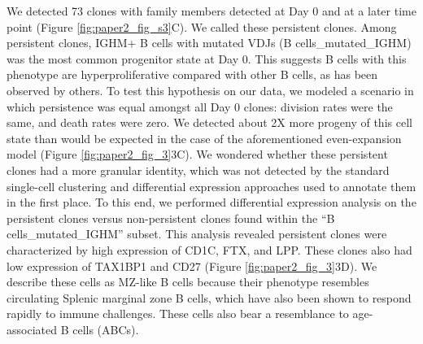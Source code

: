 We detected 73 clones with family members detected at Day 0 and at a later time point (Figure \ref{fig:paper2_fig_s3}C). We called these persistent clones. Among persistent clones, IGHM+ B cells with mutated VDJs (B cells\_mutated\_IGHM) was the most common progenitor state at Day 0. This suggests B cells with this phenotype are hyperproliferative compared with other B cells, as has been observed by others\cite{seifert_functional_2015}. To test this hypothesis on our data, we modeled a scenario in which persistence was equal amongst all Day 0 clones: division rates were the same, and death rates were zero. We detected about 2X more progeny of this cell state than would be expected in the case of the aforementioned even-expansion model (Figure \ref{fig:paper2_fig_3}3C). We wondered whether these persistent clones had a more granular identity, which was not detected by the standard single-cell clustering and differential expression approaches used to annotate them in the first place. To this end, we performed differential expression analysis on the persistent clones versus non-persistent clones found within the “B cells\_mutated\_IGHM” subset. This analysis revealed persistent clones were characterized by high expression of CD1C, FTX, and LPP. These clones also had low expression of TAX1BP1 and CD27 (Figure \ref{fig:paper2_fig_3}3D). We describe these cells as MZ-like B cells because their phenotype resembles circulating Splenic marginal zone B cells, which have also been shown to respond rapidly to immune challenges\cite{weller_human_2004}. These cells also bear a resemblance to age-associated B cells (ABCs)\cite{cancro_age-associated_2020}.

